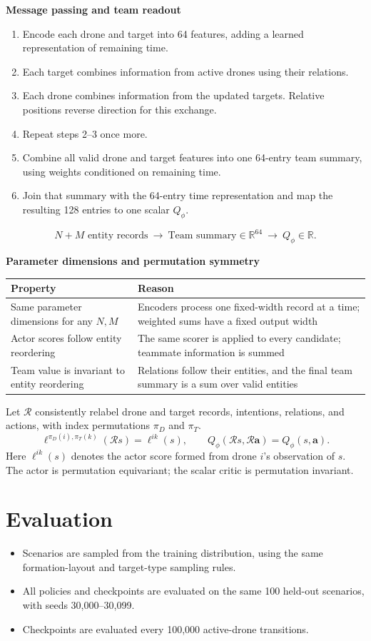 \documentclass[11pt,a4paper]{article}
\newcommand{\R}{\mathbb R}
\newcommand{\lead}[1]{\medskip\textbf{#1}\par}
\begin{document}
\lead{Message passing and team readout}
\begin{enumerate}
\item Encode each drone and target into 64 features, adding a learned representation of remaining time.
\item Each target combines information from active drones using their relations.
\item Each drone combines information from the updated targets. Relative positions reverse direction for this exchange.
\item Repeat steps 2--3 once more.
\item Combine all valid drone and target features into one 64-entry team summary, using weights conditioned on remaining time.
\item Join that summary with the 64-entry time representation and map the resulting 128 entries to one scalar $Q_\phi$.
\end{enumerate}
\[
\boxed{N+M\text{ entity records}}\ \longrightarrow\
\boxed{\text{Team summary}\in\R^{64}}\ \longrightarrow\
\boxed{Q_\phi\in\R}.
\]

\lead{Parameter dimensions and permutation symmetry}
\begin{center}
\begin{tabularx}{\linewidth}{@{}lX@{}}
\toprule
Property & Reason \\
\midrule
Same parameter dimensions for any $N,M$ & Encoders process one fixed-width record at a time; weighted sums have a fixed output width \\
Actor scores follow entity reordering & The same scorer is applied to every candidate; teammate information is summed \\
Team value is invariant to entity reordering & Relations follow their entities, and the final team summary is a sum over valid entities \\
\bottomrule
\end{tabularx}
\end{center}
Let $\mathcal R$ consistently relabel drone and target records, intentions,
relations, and actions, with index permutations $\pi_D$ and $\pi_T$.
\[
\ell^{\pi_D(i),\pi_T(k)}(\mathcal R s)=\ell^{ik}(s),\qquad
Q_\phi(\mathcal R s,\mathcal R\boldsymbol a)=Q_\phi(s,\boldsymbol a).
\]
Here $\ell^{ik}(s)$ denotes the actor score formed from drone $i$'s observation
of $s$. The actor is permutation equivariant; the scalar critic is permutation invariant.

\newpage
\section{Evaluation}
\begin{itemize}
\item Scenarios are sampled from the training distribution, using the same
formation-layout and target-type sampling rules.
\item All policies and checkpoints are evaluated on the same 100 held-out
scenarios, with seeds 30,000--30,099.
\item Checkpoints are evaluated every 100,000 active-drone transitions.
\end{itemize}
\end{document}
